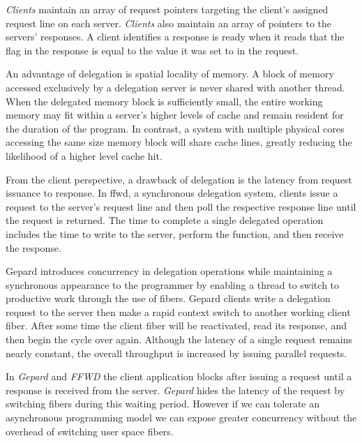\documentclass{uicthesi}
\begin{document}
\textit{Clients} maintain an array of request pointers targeting the client's assigned request line on each server. \textit{Clients} also maintain an array of pointers to the servers' responses. A client identifies a response is ready when it reads that the flag in the response is equal to the value it was set to in the request. 

An advantage of delegation is spatial locality of memory. A block of memory accessed exclusively by a delegation server is never shared with another thread. When the delegated memory block is sufficiently small, the entire working memory may fit within a server's higher levels of cache and remain resident for the duration of the program. In contrast, a system with multiple physical cores accessing the same size memory block will share cache lines, greatly reducing the likelihood of a higher level cache hit. 

From the client perspective, a drawback of delegation is the latency from request issuance to response. In ffwd, a synchronous delegation system, clients issue a request to the server's request line and then poll the respective response line until the request is returned. The time to complete a single delegated operation includes the time to write to the server, perform the function, and then receive the response. 

Gepard introduces concurrency in delegation operations while maintaining a synchronous appearance to the programmer by enabling a thread to switch to productive work through the use of fibers. Gepard clients write a delegation request to the server then make a rapid context switch to another working client fiber. After some time the client fiber will be reactivated, read its response, and then begin the cycle over again. Although the latency of a single request remains nearly constant, the overall throughput is increased by issuing parallel requests. 

In \textit{Gepard} and \textit{FFWD} the client application blocks after issuing a request until a response is received from the server. \textit{Gepard} hides the latency of the request by switching fibers during this waiting period. However if we can tolerate an asynchronous programming model we can expose greater concurrency without the overhead of switching user space fibers. 

\end{document}
